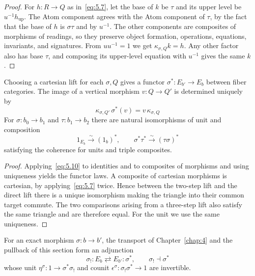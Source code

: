 \begin{proof}

For $h:R\to Q$ as in~\eqref{eq:5.7}, let the base of $k$ be $\tau$ and its upper level be
$u^{-1}h_{\mathrm{up}}$. The Atom component agrees with the Atom component of $\tau$, by the fact that
the base of $h$ is $\sigma\tau$ and by $u^{-1}$. The other components are composites of
morphisms of readings, so they preserve object formation, operations, equations, invariants,
and signatures. From $uu^{-1}=1$ we get $\kappa_{\sigma,Q}k=h$. Any other factor also has
base $\tau$, and composing its upper-level equation with $u^{-1}$ gives the same $k$.

\end{proof}

\begin{lemma}\label{lem:5.7}

Choosing a cartesian lift for each $\sigma,Q$ gives a functor $\sigma^*:E_{b'}\to E_b$ between fiber
categories. The image of a vertical morphism $v:Q\to Q'$ is determined uniquely by
\begin{equation*}
\kappa_{\sigma,Q'}\,\sigma^*(v)
=v\,\kappa_{\sigma,Q}
\tag{5.10}\label{eq:5.10}
\end{equation*}
For $\sigma:b_0\to b_1$ and $\tau:b_1\to b_2$ there are natural isomorphisms of unit and
composition
\begin{equation*}
1_{E_b}\xrightarrow{\sim}(1_b)^*,
\qquad
\sigma^*\tau^*\xrightarrow{\sim}(\tau\sigma)^*
\tag{5.11}\label{eq:5.11}
\end{equation*}
satisfying the coherence for units and triple composites.

\end{lemma}

\begin{proof}

Applying~\eqref{eq:5.10} to identities and to composites of morphisms and using uniqueness
yields the functor laws. A composite of cartesian morphisms is cartesian, by
applying~\eqref{eq:5.7} twice. Hence between the two-step lift and the direct lift there is a
unique isomorphism making the triangle into their common target commute. The two comparisons
arising from a three-step lift also satisfy the same triangle and are therefore equal. For
the unit we use the same uniqueness.

\end{proof}

\begin{proposition}\label{prop:5.8}

For an exact morphism $\sigma:b\to b'$, the transport of Chapter~\ref{chap:4} and the
pullback of this section form an adjunction
\begin{equation*}
\sigma_!:E_b\rightleftarrows E_{b'}:\sigma^*,
\qquad \sigma_!\dashv\sigma^*
\tag{5.12}\label{eq:5.12}
\end{equation*}
whose unit $\eta^\sigma:1\to\sigma^*\sigma_!$ and counit
$\epsilon^\sigma:\sigma_!\sigma^*\to1$ are invertible.

\end{proposition}

